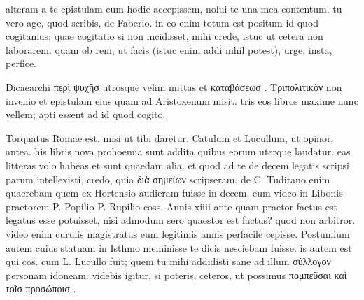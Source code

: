 


 alteram a te epistulam cum hodie accepissem, nolui te una mea contentum. tu vero age, quod scribis, de Faberio. in eo enim totum est positum id quod cogitamus; quae cogitatio si non incidisset, mihi crede, istuc ut cetera non laborarem. quam ob rem, ut facis (istuc enim addi nihil potest), urge, insta, perfice.

 Dicaearchi περὶ ψυχῆσ utrosque velim mittas et καταβάσεωσ . Τριπολιτικὸν non invenio et epistulam eius quam ad Aristoxenum misit. tris eos libros maxime nunc vellem; apti essent ad id quod cogito.

 Torquatus Romae est. misi ut tibi daretur. Catulum et Lucullum, ut opinor, antea. his libris nova prohoemia sunt addita quibus eorum uterque laudatur. eas litteras volo habeas et sunt quaedam alia. et quod ad te de decem legatis scripsi parum intellexisti, credo, quia διὰ σημείων scripseram. de C. Tuditano enim quaerebam quem ex Hortensio audieram fuisse in decem. eum video in Libonis praetorem P. Popilio P. Rupilio coss. Annis xiiii ante quam praetor factus est legatus esse potuisset, nisi admodum sero quaestor est factus? quod non arbitror. video enim curulis magistratus eum legitimis annis perfacile cepisse. Postumium autem cuius statuam in Isthmo meminisse te dicis nesciebam fuisse. is autem est qui cos. cum L. Lucullo fuit; quem tu mihi addidisti sane ad illum σύλλογον personam idoneam. videbis igitur, si poteris, ceteros, ut possimus πομπεῦσαι καὶ τοῖσ προσώποισ .
